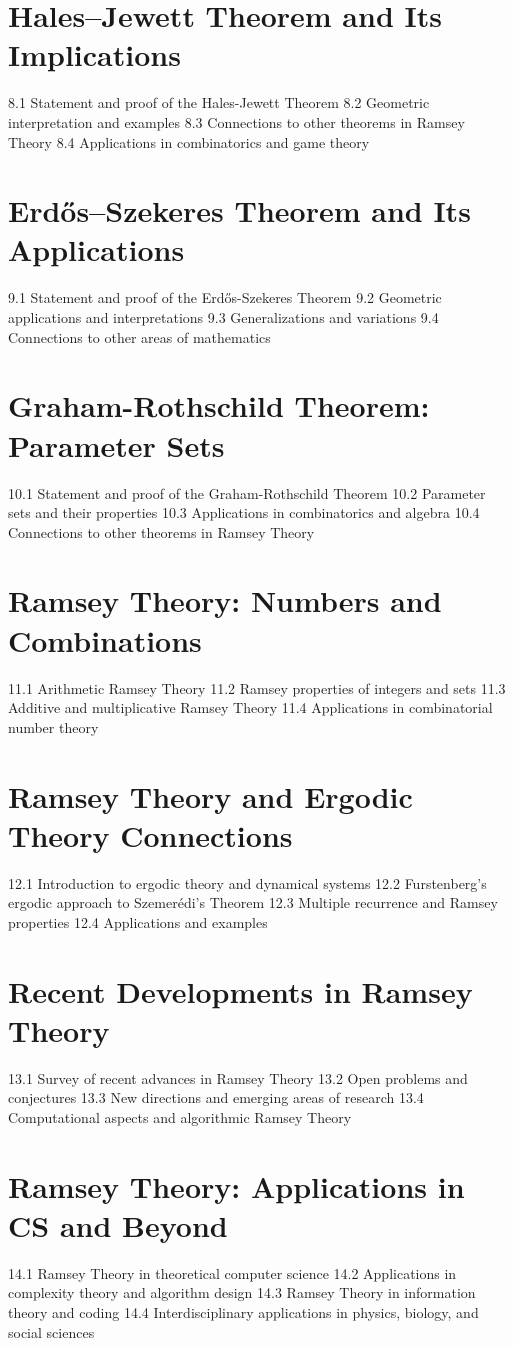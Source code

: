 \section{Hales–Jewett Theorem and Its Implications}
8.1 Statement and proof of the Hales-Jewett Theorem
8.2 Geometric interpretation and examples
8.3 Connections to other theorems in Ramsey Theory
8.4 Applications in combinatorics and game theory
\section{Erdős–Szekeres Theorem and Its Applications}
9.1 Statement and proof of the Erdős-Szekeres Theorem
9.2 Geometric applications and interpretations
9.3 Generalizations and variations
9.4 Connections to other areas of mathematics
\section{Graham-Rothschild Theorem: Parameter Sets}
10.1 Statement and proof of the Graham-Rothschild Theorem
10.2 Parameter sets and their properties
10.3 Applications in combinatorics and algebra
10.4 Connections to other theorems in Ramsey Theory
\section{Ramsey Theory: Numbers and Combinations}
11.1 Arithmetic Ramsey Theory
11.2 Ramsey properties of integers and sets
11.3 Additive and multiplicative Ramsey Theory
11.4 Applications in combinatorial number theory
\section{Ramsey Theory and Ergodic Theory Connections}
12.1 Introduction to ergodic theory and dynamical systems
12.2 Furstenberg's ergodic approach to Szemerédi's Theorem
12.3 Multiple recurrence and Ramsey properties
12.4 Applications and examples
\section{Recent Developments in Ramsey Theory}
13.1 Survey of recent advances in Ramsey Theory
13.2 Open problems and conjectures
13.3 New directions and emerging areas of research
13.4 Computational aspects and algorithmic Ramsey Theory
\section{Ramsey Theory: Applications in CS and Beyond}
14.1 Ramsey Theory in theoretical computer science
14.2 Applications in complexity theory and algorithm design
14.3 Ramsey Theory in information theory and coding
14.4 Interdisciplinary applications in physics, biology, and social sciences

